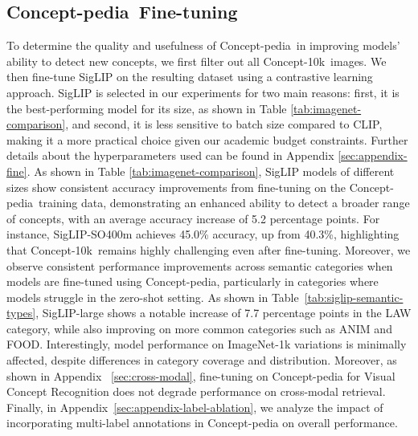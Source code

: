 \documentclass[11pt]{article}
\newcommand{\resource}{Concept-pedia}
\newcommand{\benchmark}{Concept-10k}
\begin{document}
\subsection{\resource~Fine-tuning}
To determine the quality and usefulness of \resource~in improving models' ability to detect new concepts, we first filter out all \benchmark~images. We then fine-tune SigLIP on the resulting dataset using a contrastive learning approach.
SigLIP is selected in our experiments for two main reasons: first, it is the best-performing model for its size, as shown in Table \ref{tab:imagenet-comparison}, and second, it is less sensitive to batch size compared to CLIP, making it a more practical choice given our academic budget constraints.
Further details about the hyperparameters used can be found in Appendix \ref{sec:appendix-fine}.
As shown in Table \ref{tab:imagenet-comparison}, SigLIP models of different sizes show consistent accuracy improvements from fine-tuning on the \resource~training data, demonstrating an enhanced ability to detect a broader range of concepts, with an average accuracy increase of 5.2 percentage points.
For instance, SigLIP-SO400m achieves 45.0\% accuracy, up from 40.3\%, highlighting that \benchmark~remains highly challenging even after fine-tuning.
 Moreover, we observe consistent performance improvements across semantic categories when models are fine-tuned using \resource, particularly in categories where models struggle in the zero-shot setting. As shown in Table~\ref{tab:siglip-semantic-types}, SigLIP-large shows a notable increase of 7.7 percentage points in the LAW category, while also improving on more common categories such as ANIM and FOOD. 
 Interestingly, model performance on ImageNet-1k variations is minimally affected, despite differences in category coverage and distribution. 
 Moreover, as shown in Appendix ~\ref{sec:cross-modal}, fine-tuning on \resource{} for Visual Concept Recognition does not degrade performance on cross-modal retrieval. Finally, in Appendix~\ref{sec:appendix-label-ablation}, we analyze the impact of incorporating multi-label annotations in \resource{} on overall performance.
 
\end{document}
